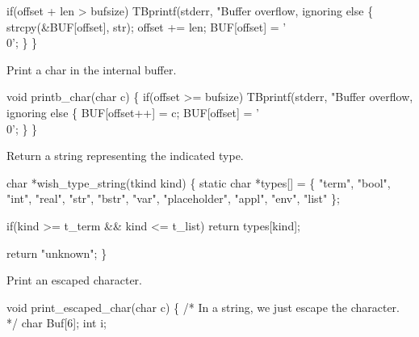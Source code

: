   if(offset + len > bufsize)
    TBprintf(stderr, "Buffer overflow, ignoring %
  else \{
    strcpy(&BUF[offset], str);
    offset += len;
    BUF[offset] = '\\0';
  \}
\}
\nwendcode{}\nwdocspar

Print a char in the internal buffer.

\nwenddocs{}\endmoddef\let\nwnotused=\nwoutput{}\nwstartdeflinemarkup{}\nwenddeflinemarkup
void printb_char(char c)
\{
  if(offset >= bufsize)
    TBprintf(stderr, "Buffer overflow, ignoring %
  else \{
    BUF[offset++] = c;
    BUF[offset] = '\\0';
  \}
\}
\nwendcode{}\nwdocspar



Return a string representing the indicated type.

\nwenddocs{}\endmoddef\let\nwnotused=\nwoutput{}\nwstartdeflinemarkup{}\nwenddeflinemarkup
char *wish_type_string(tkind kind)
\{
  static char *types[] =
    \{ "term", "bool", "int", "real", "str", "bstr", "var",
      "placeholder", "appl", "env", "list"
    \};

  if(kind >= t_term && kind <= t_list)
    return types[kind];

  return "unknown";
\}
\nwendcode{}\nwdocspar


Print an escaped character.

\nwenddocs{}\endmoddef\let\nwnotused=\nwoutput{}\nwstartdeflinemarkup{}\nwenddeflinemarkup
void print_escaped_char(char c)
\{
  /* In a string, we just escape the character. */
  char Buf[6];
  int i;
  

